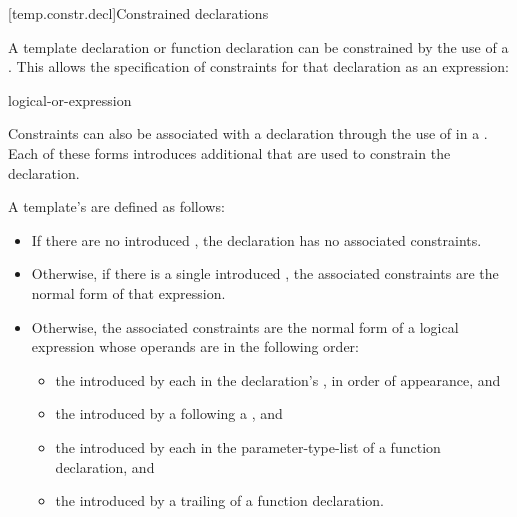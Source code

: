 [temp.constr.decl]{Constrained declarations}

\pnum
A template declaration
or function declaration
can be constrained by the use of a .
This allows the specification of constraints for that declaration as
an expression:

\begin{bnf}
\br
    logical-or-expression
\end{bnf}

\pnum
Constraints can also be associated with a declaration through the use of
 in a
.
Each of these forms introduces additional 
that are used to constrain the declaration.

\pnum
{}%
A template's  are defined as follows:

\begin{itemize}
\item If there are no introduced ,
the declaration has no associated constraints.

\item Otherwise, if there is a single introduced ,
the associated constraints are the normal form
of that expression.

\item Otherwise, the associated constraints are the normal form of a logical
 expression whose operands are in the
following order:

\begin{itemize}
\item
the  introduced by
each  in
the declaration's ,
in order of appearance, and

\item
the  introduced by
a  following
a , and

\item
the  introduced by
each  in
the parameter-type-list of a function declaration, and

\item
the  introduced by
a trailing  of
a function declaration.
\end{itemize}
\end{itemize}

